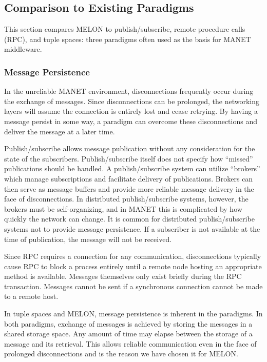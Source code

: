 \documentclass[lnicst]{svmultln}
\begin{document}
\subsection{Comparison to Existing Paradigms}

This section compares MELON to publish/subscribe, remote procedure calls (RPC), and tuple spaces: three paradigms often used as the basis for MANET middleware.

\subsubsection{Message Persistence}

In the unreliable MANET environment, disconnections frequently occur during the exchange of messages. Since disconnections can be prolonged, the networking layers will assume the connection is entirely lost and cease retrying. By having a message persist in some way, a paradigm can overcome these disconnections and deliver the message at a later time.

Publish/subscribe allows message publication without any consideration for the state of the subscribers. Publish/subscribe itself does not specify how ``missed'' publications should be handled. A publish/subscribe system can utilize ``brokers'' which manage subscriptions and facilitate delivery of publications. Brokers can then serve as message buffers and provide more reliable message delivery in the face of disconnections. In distributed publish/subscribe systems, however, the brokers must be self-organizing, and in MANET this is complicated by how quickly the network can change. It is common for distributed publish/subscribe systems not to provide message persistence. If a subscriber is not available at the time of publication, the message will not be received.

Since RPC requires a connection for any communication, disconnections typically cause RPC to block a process entirely until a remote node hosting an appropriate method is available. Messages themselves only exist briefly during the RPC transaction. Messages cannot be sent if a synchronous connection cannot be made to a remote host.
    
In tuple spaces and MELON, message persistence is inherent in the paradigms. In both paradigms, exchange of messages is achieved by storing the messages in a shared storage space. Any amount of time may elapse between the storage of a message and its retrieval. This allows reliable communication even in the face of prolonged disconnections and is the reason we have chosen it for MELON.
    
\end{document}
